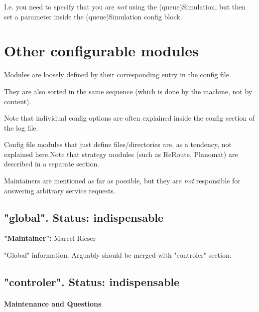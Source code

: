 I.e. you need to specify that you are \emph{not} using the (queue)Simulation, but then set a parameter inside the (queue)Simulation config block.

\vfill\eject

\chapter{Other configurable modules}




Modules are loosely defined by their corresponding entry in the config file.

They are also sorted in the same sequence (which is done by the machine, not by content).

Note that individual config options are often explained inside the config section of the log file.

Config file modules that just define files/directories are, as a tendency, not explained here.Note that strategy modules (such as ReRoute, Planomat) are described in a separate section.

Maintainers are mentioned as far as possible, but they are \emph{not} responsible for answering arbitrary service requests.

\vfill\eject
\section{"global". Status: indispensable}

\textbf{"Maintainer":} Marcel Rieser

"Global" information. Arguably should be merged with "controler" section.

\vfill\eject
\section{"controler". Status: indispensable}

\subsubsection{\textbf{Maintenance and Questions}}

